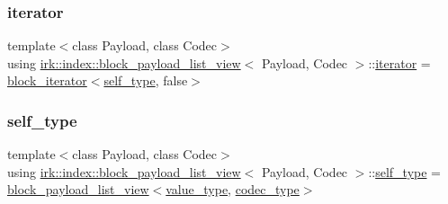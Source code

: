 \subsubsection{\texorpdfstring{iterator}{iterator}}
{\footnotesize\ttfamily template$<$class Payload, class Codec$>$ \\
using \mbox{\hyperlink{classirk_1_1index_1_1block__payload__list__view}{irk\+::index\+::block\+\_\+payload\+\_\+list\+\_\+view}}$<$ Payload, Codec $>$\+::\mbox{\hyperlink{classirk_1_1index_1_1block__payload__list__view_a201e879cc73a3fd9476a2e1043f4d74d}{iterator}} =  \mbox{\hyperlink{classirk_1_1index_1_1block__iterator}{block\+\_\+iterator}}$<$\mbox{\hyperlink{classirk_1_1index_1_1block__payload__list__view_ad73e053770215907333add2295707aec}{self\+\_\+type}}, false$>$}

\mbox{\label{classirk_1_1index_1_1block__payload__list__view_ad73e053770215907333add2295707aec}} 
\subsubsection{\texorpdfstring{self\+\_\+type}{self\_type}}
{\footnotesize\ttfamily template$<$class Payload, class Codec$>$ \\
using \mbox{\hyperlink{classirk_1_1index_1_1block__payload__list__view}{irk\+::index\+::block\+\_\+payload\+\_\+list\+\_\+view}}$<$ Payload, Codec $>$\+::\mbox{\hyperlink{classirk_1_1index_1_1block__payload__list__view_ad73e053770215907333add2295707aec}{self\+\_\+type}} =  \mbox{\hyperlink{classirk_1_1index_1_1block__payload__list__view}{block\+\_\+payload\+\_\+list\+\_\+view}}$<$\mbox{\hyperlink{classirk_1_1index_1_1block__payload__list__view_aa7df004298a0dd0b1676007bbd43fe98}{value\+\_\+type}}, \mbox{\hyperlink{classirk_1_1index_1_1block__payload__list__view_a2f176f6aaee1081eb5c64e5397dab6b2}{codec\+\_\+type}}$>$}

\mbox{\label{classirk_1_1index_1_1block__payload__list__view_a6b2a03ea0d351acce93c4e52b642b4db}} 
